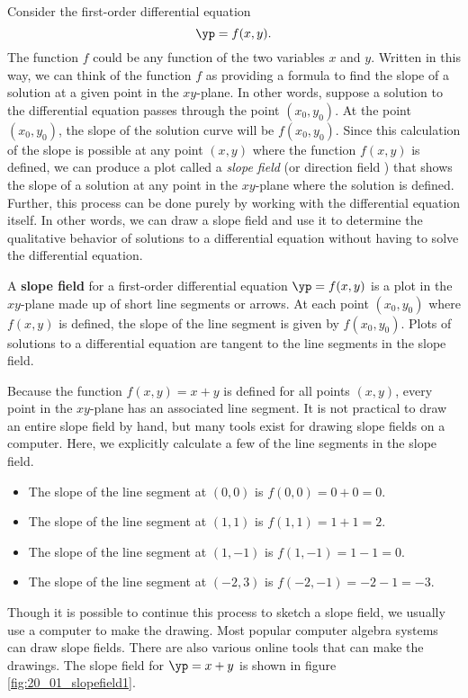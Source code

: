Consider the first-order differential equation
\[\yp = f(x,y).\]
The function $f$ could be any function of the two variables $x$ and $y$.  Written in this way, we can think of the function $f$ as providing a formula to find the slope of a solution at a given point in the $xy$-plane.  In other words, suppose a solution to the differential equation passes through the point $(x_0,y_0)$.  At the point $(x_0,y_0)$, the slope of the solution curve will be $f(x_0,y_0).$  Since this calculation of the slope is possible at any point $(x,y)$ where the function $f(x,y)$ is defined, we can produce a plot called a \emph{slope field} (or direction field ) that shows the slope of a solution at any point in the $xy$-plane where the solution is defined.  Further, this process can be done purely by working with the differential equation itself.  In other words, we can draw a slope field and use it to determine the qualitative behavior of solutions to a differential equation without having to solve the differential equation.

{A \textbf{slope field} for a first-order differential equation $\yp = f(x,y)$ is a plot in the $xy$-plane made up of short line segments or arrows. At each point $(x_0,y_0)$ where $f(x,y)$ is defined, the slope of the line segment is given by $f(x_0,y_0)$. Plots of solutions to a differential equation are tangent to the line segments in the slope field.}\\

{Because the function $f(x,y) = x+y$ is defined for all points $(x,y)$, every point in the $xy$-plane has an associated line segment. It is not practical to draw an entire slope field by hand, but many tools exist for drawing slope fields on a computer.  Here, we explicitly calculate  a few of the line segments in the slope field.

\begin{itemize}
\item The slope of the line segment at $(0,0)$ is $f(0,0) = 0 + 0 = 0.$
\item The slope of the line segment at $(1,1)$ is $f(1,1) = 1 + 1 = 2.$
\item The slope of the line segment at $(1,-1)$ is $f(1,-1) = 1 - 1 = 0.$
\item The slope of the line segment at $(-2,3)$ is $f(-2,-1) = -2 - 1 = -3.$
\end{itemize}

Though it is possible to continue this process to sketch a slope field, we usually use a computer to make the drawing.  Most popular computer algebra systems can draw slope fields.  There are also various online tools that can make the drawings.  The slope field for $\yp = x+y$ is shown in figure \ref{fig:20_01_slopefield1}.
}\\

